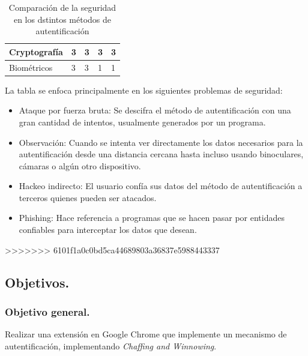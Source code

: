 \documentclass[12pt, a4paper, titlepage]{article}
\begin{document}
\begin{table}[htb]
{\begin{tabular}{l|l|l|l|l|}
						\multicolumn{1}{|l|}{Cryptografía}                                                     & 3                                                                 & 3           & 3                                                          & 3        \\ \hline
						\multicolumn{1}{|l|}{Biométricos}                                                      & 3                                                                 & 3           & 1                                                          & 1        \\ \hline
					\end{tabular}
				}
			\caption{Comparación de la seguridad en los dstintos métodos de autentificación}
			\end{table}
		La tabla se enfoca principalmente en los siguientes problemas de seguridad: 
		
		\begin{itemize}
			\item Ataque por fuerza bruta: Se descifra el método de autentificación con una gran cantidad de intentos, usualmente generados por un programa.
			\item Observación: Cuando se intenta ver directamente los datos necesarios para la autentificación desde una distancia cercana hasta incluso usando binoculares, cámaras o algún otro dispositivo.
			\item Hackeo indirecto: El usuario confía sus datos del método de autentificación a terceros quienes pueden ser atacados. 
			\item Phishing: Hace referencia a programas que se hacen pasar por entidades confiables para interceptar los datos que desean.
		\end{itemize}
			
>>>>>>> 6101f1a0c0bd5ca44689803a36837e5988443337
		\subsection{Objetivos.}
			\subsubsection{Objetivo general. }
			Realizar una extensión en Google Chrome que implemente un mecanismo de autentificación, implementando \textit{Chaffing and Winnowing}.\\
\end{document}
